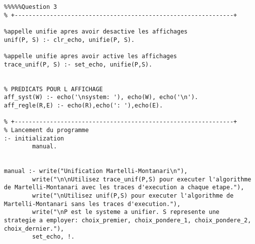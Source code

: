 \documentclass[10pt,a4paper]{report}
\begin{document}
\begin{lstlisting}[caption ={le fichier main.pl}]
% +--------------------------------------------------------------+
%%%%%Question 3
% +--------------------------------------------------------------+

%appelle unifie apres avoir desactive les affichages 
unif(P, S) :- clr_echo, unifie(P, S).

%appelle unifie apres avoir active les affichages
trace_unif(P, S) :- set_echo, unifie(P,S).


% PREDICATS POUR L AFFICHAGE
aff_syst(W) :- echo('\nsystem: '), echo(W), echo('\n').
aff_regle(R,E) :- echo(R),echo(': '),echo(E).

% +--------------------------------------------------------------+
% Lancement du programme
:- initialization
        manual.


manual :- write("Unification Martelli-Montanari\n"),
		write("\n\nUtilisez trace_unif(P,S) pour executer l'algorithme de Martelli-Montanari avec les traces d'execution a chaque etape."),
		write("\nUtilisez unif(P,S) pour executer l'algorithme de Martelli-Montanari sans les traces d'execution."),
		write("\nP est le systeme a unifier. S represente une strategie a employer: choix_premier, choix_pondere_1, choix_pondere_2, choix_dernier."),
		set_echo, !.
\end{lstlisting}
\end{document}

